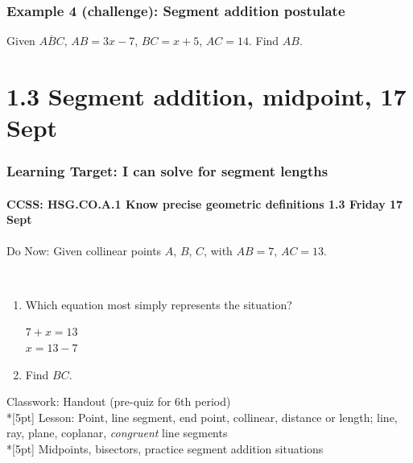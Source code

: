 \documentclass{beamer}
\begin{document}
  \frame
  {
    \frametitle{Example 4 (challenge): Segment addition postulate}
    
    Given $\overline{ABC}$, $AB=3x-7$, $BC=x+5$, $AC=14$. Find ${AB}$.\\[0.5in]
        \vspace{1cm}
  }

\section{1.3 Segment addition, midpoint, 17 Sept}
\frame
{
  \frametitle{Learning Target: I can solve for segment lengths}
  \framesubtitle{CCSS: HSG.CO.A.1 Know precise geometric definitions  \hfill \alert{1.3 Friday 17 Sept}}

  Do Now: Given collinear points $A$, $B$, $C$, with $AB=7$, $AC=13$.
       \\ \vspace{0.2cm}
    \begin{enumerate}
      \item Which equation most simply represents the situation?
      \begin{multicols}{2}
        $7 + x = 13$ \\
        $x = 13 - 7$
      \end{multicols}
    \item Find $BC$.
    \end{enumerate}
    Classwork: Handout (pre-quiz for 6th period) \\*[5pt]
  Lesson: Point, line segment, end point, collinear, distance or length; line, ray, plane, coplanar, \emph{congruent} line segments \\*[5pt]
  Midpoints, bisectors, practice segment addition situations
  }
\end{document}
